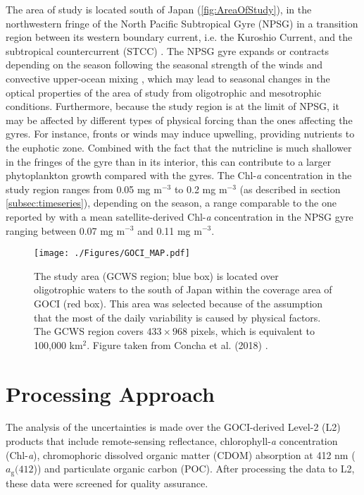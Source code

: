 \documentclass[remotesensing,article,submit,moreauthors,pdftex,10pt,a4paper]{Definitions/mdpi}
\begin{document}
The area of study is located south of Japan (\autoref{fig:AreaOfStudy}), in the northwestern fringe of the North Pacific Subtropical Gyre (NPSG) in a transition region between its western boundary current, i.e. the Kuroshio Current, and the subtropical countercurrent (STCC) \cite{Qiu_2011_Kuroshio}. The NPSG gyre expands or contracts depending on the season following the seasonal strength of the winds and convective upper-ocean mixing \cite{McClain_2004_gyres,Signorini_2015}, which may lead to seasonal changes in the optical properties of the area of study from oligotrophic and mesotrophic conditions. Furthermore, because the study region is at the limit of NPSG, it may be affected by different types of physical forcing than the ones affecting the gyres. For instance, fronts or winds may induce upwelling, providing nutrients to the euphotic zone. Combined with the fact that the nutricline is much shallower in the fringes of the gyre than in its interior, this can contribute to a larger phytoplankton growth compared with the gyres. The Chl-{\it a} concentration in the study region ranges from 0.05 mg m$^{-3}$ to 0.2 mg m$^{-3}$ (as described in section \ref{subsec:timeseries}), depending on the season, a range comparable to the one reported by \cite{Signorini_2015} with a mean satellite-derived Chl-{\it a} concentration in the NPSG gyre ranging between 0.07 mg m$^{-3}$ and 0.11 mg m$^{-3}$.

\begin{figure}[ht]
\centering
\texttt{[image: ./Figures/GOCI\_MAP.pdf]}
  \caption{The study area (GCWS region; blue box) is located over oligotrophic waters to the south of Japan within the coverage area of GOCI (red box). This area was selected because of the assumption that the most of the daily variability is caused by physical factors. The GCWS region covers $433\times968$ pixels, which is equivalent to 100,000 km$^2$. Figure taken from Concha et al. (2018) \cite{Concha_2018a}.}
	\label{fig:AreaOfStudy}
\end{figure}


\section{Processing Approach}
\label{sec:processing}
The analysis of the uncertainties is made over the GOCI-derived Level-2 (L2) products that include remote-sensing reflectance, chlorophyll-{\it a} concentration (Chl-{\it a}), chromophoric dissolved organic matter (CDOM) absorption at 412 nm ($a_\text{g}(412$)) and particulate organic carbon (POC). After processing the data to L2, these data were screened for quality assurance. 
\end{document}
